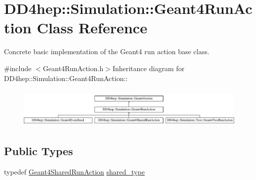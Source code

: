\hypertarget{class_d_d4hep_1_1_simulation_1_1_geant4_run_action}{
\section{DD4hep::Simulation::Geant4RunAction Class Reference}
\label{class_d_d4hep_1_1_simulation_1_1_geant4_run_action}
}


Concrete basic implementation of the Geant4 run action base class.  


{\ttfamily \#include $<$Geant4RunAction.h$>$}Inheritance diagram for DD4hep::Simulation::Geant4RunAction::\begin{figure}[H]
\begin{center}
\leavevmode
\includegraphics[height=1.96491cm]{class_d_d4hep_1_1_simulation_1_1_geant4_run_action}
\end{center}
\end{figure}
\subsection*{Public Types}
\begin{DoxyCompactItemize}
\item 
typedef \hyperlink{class_d_d4hep_1_1_simulation_1_1_geant4_shared_run_action}{Geant4SharedRunAction} \hyperlink{class_d_d4hep_1_1_simulation_1_1_geant4_run_action_a188fa9477fc65c6c825bf55abd0088e3}{shared\_\-type}
\end{DoxyCompactItemize}

